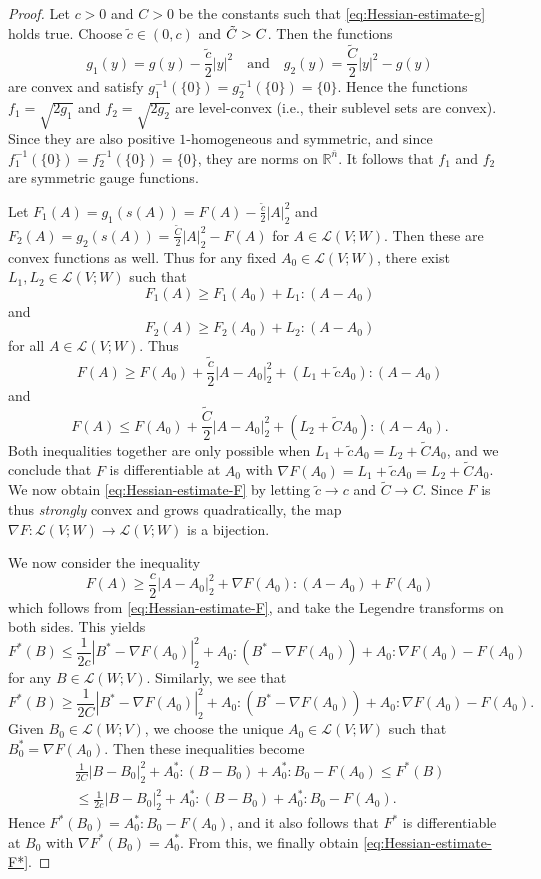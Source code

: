 \documentclass[a4paper]{article}
\newcommand{\R}{\mathbb{R}}
\newcommand{\ndim}{{\bar{n}}}
\newcommand{\Lin}{\mathcal{L}}
\theoremstyle{definition}
\theoremstyle{remark}
\begin{document}
\begin{proof}
Let $c > 0$ and $C > 0$ be the constants such that \eqref{eq:Hessian-estimate-g} holds true.
Choose $\tilde{c} \in (0, c)$ and $\Tilde{C} > C$. Then the functions
\[
g_1(y) = g(y) - \frac{\tilde{c}}{2} |y|^2 \quad \text{and} \quad g_2(y) = \frac{\tilde{C}}{2} |y|^2 - g(y)
\]
are convex and satisfy $g_1^{-1}(\{0\}) = g_2^{-1}(\{0\}) = \{0\}$. Hence the functions $f_1 = \sqrt{2 g_1}$ and $f_2 = \sqrt{2 g_2}$ are level-convex (i.e., their sublevel sets are convex). Since they are also positive $1$-homogeneous and symmetric, and since $f_1^{-1}(\{0\}) = f_2^{-1}(\{0\}) = \{0\}$, they are
norms on $\R^\ndim$. It follows that $f_1$ and $f_2$ are symmetric gauge functions.

Let $F_1(A) = g_1(s(A)) = F(A) - \frac{\tilde{c}}{2} |A|_2^2$ and $F_2(A) = g_2(s(A)) = \frac{\tilde{C}}{2}|A|_2^2 - F(A)$ for $A \in \Lin(V; W)$. Then these are convex functions as well. Thus for any fixed $A_0 \in \Lin(V; W)$, there exist $L_1, L_2 \in \Lin(V; W)$ such that
\[
F_1(A) \ge F_1(A_0) + L_1 : (A - A_0)
\]
and
\[
F_2(A) \ge F_2(A_0) + L_2 : (A - A_0)
\]
for all $A \in \Lin(V; W)$. Thus
\[
F(A) \ge F(A_0) + \frac{\tilde{c}}{2} |A - A_0|_2^2 + (L_1 + \tilde{c}A_0) : (A - A_0)
\]
and
\[
F(A) \le F(A_0) + \frac{\tilde{C}}{2} |A - A_0|_2^2 + (L_2 + \tilde{C}A_0) : (A - A_0).
\]
Both inequalities together are only possible when $L_1 + \tilde{c} A_0 = L_2 + \tilde{C} A_0$, and we conclude that $F$ is differentiable at $A_0$
with $\nabla F(A_0) = L_1 + \tilde{c} A_0 = L_2 + \tilde{C} A_0$.
We now obtain \eqref{eq:Hessian-estimate-F} by letting $\tilde{c} \to c$ and $\tilde{C} \to C$.
Since $F$ is thus \emph{strongly} convex and grows quadratically, the map $\nabla F \colon \Lin(V; W) \to \Lin(V; W)$ is a bijection.

We now consider the inequality
\[
F(A) \ge \frac{c}{2} |A - A_0|_2^2 + \nabla F(A_0) : (A - A_0) + F(A_0) 
\]
which follows from \eqref{eq:Hessian-estimate-F}, and take the Legendre transforms on both sides. This yields
\[
F^*(B) \le \frac{1}{2c} |B^* - \nabla F(A_0)|_2^2 + A_0 : (B^* - \nabla F(A_0)) + A_0 : \nabla F(A_0) - F(A_0)
\]
for any $B \in \Lin(W; V)$. Similarly, we see that
\[
F^*(B) \ge \frac{1}{2C} |B^* - \nabla F(A_0)|_2^2 + A_0 : (B^* - \nabla F(A_0)) + A_0 : \nabla F(A_0) - F(A_0).
\]
Given $B_0 \in \Lin(W; V)$, we choose the unique $A_0 \in \Lin(V; W)$ such that $B_0^* = \nabla F(A_0)$. Then these inequalities become
\begin{multline*}
\frac{1}{2C} |B - B_0|_2^2 + A_0^* : (B - B_0) + A_0^* : B_0 - F(A_0) \le F^*(B) \\
\le \frac{1}{2c} |B - B_0|_2^2 + A_0^* : (B - B_0) + A_0^* : B_0 - F(A_0).
\end{multline*}
Hence $F^*(B_0) = A_0^* : B_0 - F(A_0)$, and it also follows that
$F^*$ is differentiable at $B_0$ with $\nabla F^*(B_0) = A_0^*$. 
From this, we finally obtain \eqref{eq:Hessian-estimate-F*}.
\end{proof}
\end{document}
